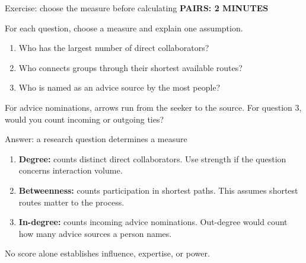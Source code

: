 \documentclass[aspectratio=169,11pt]{beamer}
\newcommand{\activity}[1]{{\small\color{accent}\bfseries #1}\par\medskip}
\begin{document}
\begin{frame}{Exercise: choose the measure before calculating}
\activity{PAIRS: 2 MINUTES}
For each question, choose a measure and explain one assumption.
\begin{enumerate}
\item Who has the largest number of direct collaborators?
\medskip\item Who connects groups through their shortest available routes?
\medskip\item Who is named as an advice source by the most people?
\end{enumerate}
\medskip
For advice nominations, arrows run from the seeker to the source.
\textcolor{accent}{For question 3, would you count incoming or outgoing ties?}
\end{frame}

\begin{frame}{Answer: a research question determines a measure}
\begin{enumerate}
\item \textbf{Degree:} counts distinct direct collaborators. Use strength if the question concerns interaction volume.
\medskip\item \textbf{Betweenness:} counts participation in shortest paths. This assumes shortest routes matter to the process.
\medskip\item \textbf{In-degree:} counts incoming advice nominations. Out-degree would count how many advice sources a person names.
\end{enumerate}
\medskip
No score alone establishes influence, expertise, or power.
\end{frame}
\end{document}
